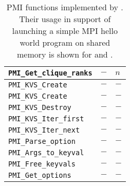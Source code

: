 \begin{table}
\begin{tabular}{|p{8cm}|p{3.5cm}|p{3cm}|}
\hline
{\tt  PMI\_Get\_clique\_ranks} & $-$ & $n$ \\
\hline
{\tt  PMI\_KVS\_Create} & $-$ & $-$ \\
\hline
{\tt  PMI\_KVS\_Create} & $-$ & $-$ \\
\hline
{\tt  PMI\_KVS\_Destroy} & $-$ & $-$ \\
\hline
{\tt  PMI\_KVS\_Iter\_first} & $-$ & $-$ \\
\hline
{\tt  PMI\_KVS\_Iter\_next} & $-$ & $-$ \\
\hline
{\tt  PMI\_Parse\_option} & $-$ & $-$ \\
\hline
{\tt  PMI\_Args\_to\_keyval} & $-$ & $-$ \\
\hline
{\tt  PMI\_Free\_keyvals} & $-$ & $-$ \\
\hline
{\tt  PMI\_Get\_options} & $-$ & $-$ \\
\hline
\end{tabular}
\caption{PMI functions implemented by \slurm.
Their usage in support of launching a simple MPI hello world program
on shared memory is shown for  and \openmpi.}
\label{tab:pmiv1}
\end{table}
